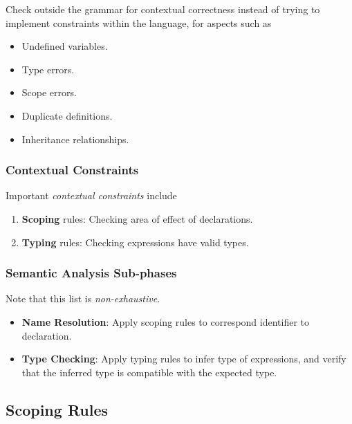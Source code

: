 Check outside the grammar for contextual correctness instead of trying to implement constraints within the language, for aspects such as
\begin{itemize}
    \item Undefined variables.
    \item Type errors.
    \item Scope errors.
    \item Duplicate definitions.
    \item Inheritance relationships.
\end{itemize}

\subsubsection{Contextual Constraints}

Important \textit{contextual constraints} include
\begin{enumerate}[itemsep=4pt, parsep=4pt, topsep=8pt, partopsep=4pt]
    \item \textbf{Scoping} rules:
        Checking area of effect of declarations.
    \item \textbf{Typing} rules: 
        Checking expressions have valid types.
\end{enumerate}

\subsubsection{Semantic Analysis Sub-phases}

Note that this list is \textit{non-exhaustive}.

\begin{itemize}[itemsep=4pt, parsep=4pt, topsep=8pt, partopsep=4pt]
    \item \textbf{Name Resolution}:
        Apply scoping rules to correspond identifier to declaration.
    \item \textbf{Type Checking}:
        Apply typing rules to infer type of expressions, and verify that the inferred type is compatible with the expected type.
\end{itemize}

\subsection{Scoping Rules}

